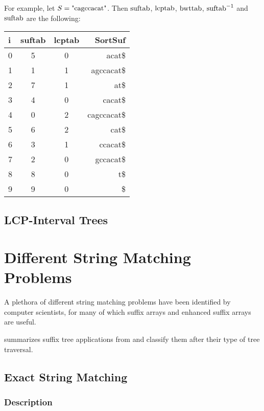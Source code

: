\documentclass[a4paper,10pt]{article}
\begin{document}
For example, let $S=\hbox{"cagccacat"}$.  Then $\hbox{suftab}$,
$\hbox{lcptab}$, $\hbox{bwttab}$, $\hbox{suftab}^{-1}$ and
$\hbox{suftab}$ are the following:

\begin{center}
	\begin{tabular}{ | l | c | c | r | }
		\hline
		i & suftab & lcptab & SortSuf \\ \hline
		0 & 5 & 0 & acat\$ \\ \hline
		1 & 1 & 1 & agccacat\$ \\ \hline
		2 & 7 & 1 & at\$ \\ \hline
		3 & 4 & 0 & cacat\$ \\ \hline
		4 & 0 & 2 & cagccacat\$ \\ \hline
		5 & 6 & 2 & cat\$ \\ \hline
		6 & 3 & 1 & ccacat\$ \\ \hline
		7 & 2 & 0 & gccacat\$ \\ \hline
		8 & 8 & 0 & t\$ \\ \hline
		9 & 9 & 0 & \$ \\ \hline
	\end{tabular}
\end{center}

\subsection*{LCP-Interval Trees}


\section*{Different String Matching Problems}

A plethora of different string matching problems have been identified
by computer scientists, for many of which suffix arrays and enhanced
suffix arrays are useful.

\citealt[pg. 2]{abouelhoda2004replacing} summarizes suffix tree applications
from \citealt[chap. 2]{gusfield1997algorithms} and classify them after their
type of tree traversal.

\subsection*{Exact String Matching}

\subsubsection*{Description}
\end{document}
